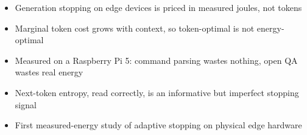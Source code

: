\begin{itemize}
\item Generation stopping on edge devices is priced in measured joules, not tokens
\item Marginal token cost grows with context, so token-optimal is not energy-optimal
\item Measured on a Raspberry Pi 5: command parsing wastes nothing, open QA wastes real energy
\item Next-token entropy, read correctly, is an informative but imperfect stopping signal
\item First measured-energy study of adaptive stopping on physical edge hardware
\end{itemize}
